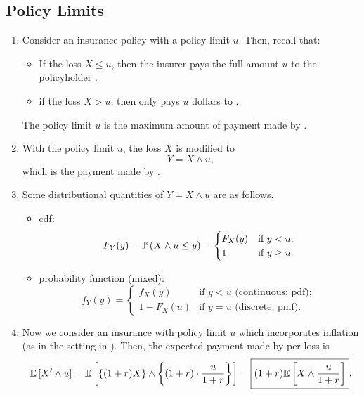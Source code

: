 \subsection{Policy Limits}
\begin{enumerate}
\item Consider an insurance policy with a policy limit \(u\). Then, recall that:
\begin{itemize}
\item If the loss \(X\le u\), then the insurer  pays the full amount \(u\) to the policyholder .
\item if the loss \(X>u\), then  only pays \(u\) dollars to .
\end{itemize}
The policy limit \(u\) is the maximum amount of payment made by .

\item With the policy limit \(u\), the loss \(X\) is modified to
\[
Y=X\wedge u,
\]
which is the payment  made by .

\item \label{it:ylim-dist-quantities}
Some distributional quantities of \(Y=X\wedge u\) are as follows.
\begin{itemize}
\item cdf:
\[
F_Y(y)=
\mathbb{P}\left(X\wedge u\le y\right)
=\begin{cases}
F_X(y)&\text{if \(y<u\)};\\
1&\text{if \(y\ge u\)}.
\end{cases}
\]
\begin{center}
\end{center}
\item probability function (mixed):
\[
f_Y(y)=\begin{cases}
f_X(y)&\text{if \(y<u\) (continuous; pdf)};\\
1-F_X(u)&\text{if \(y=u\) (discrete; pmf)}.
\end{cases}
\]
\end{itemize}
\item \label{it:inflation-ylim-mean}
Now we consider an insurance with policy limit \(u\) which incorporates
inflation (as in the setting in ). Then, the
expected payment made by  per loss is
\[
\mathbb{E}\left[X'\wedge u\right]=\mathbb{E}\left[\qty{(1+r)X}\wedge\qty{(1+r)\cdot \frac{u}{1+r}} \right]=\boxed{(1+r)\mathbb{E}\left[X\wedge \frac{u}{1+r}\right]}.
\]
\end{enumerate}
